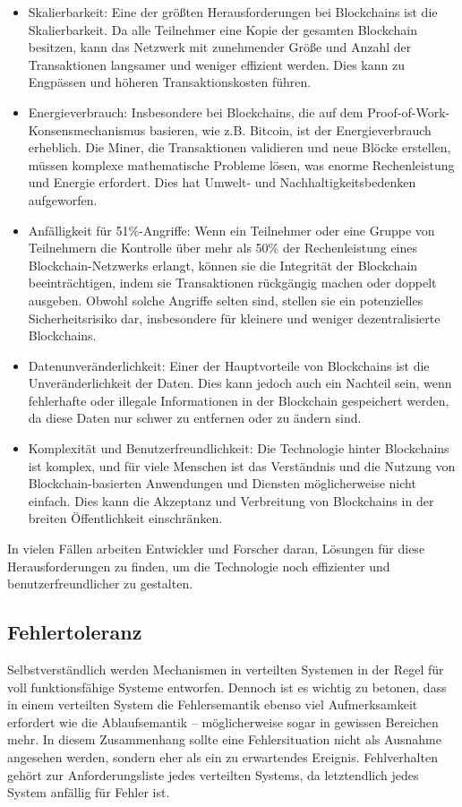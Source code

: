 \begin{itemize}
\item Skalierbarkeit: Eine der größten Herausforderungen bei Blockchains ist die Skalierbarkeit. Da alle Teilnehmer eine Kopie der gesamten Blockchain besitzen, kann das Netzwerk mit zunehmender Größe und Anzahl der Transaktionen langsamer und weniger effizient werden. Dies kann zu Engpässen und höheren Transaktionskosten führen.
\item Energieverbrauch: Insbesondere bei Blockchains, die auf dem Proof-of-Work-Konsensmechanismus basieren, wie z.B. Bitcoin, ist der Energieverbrauch erheblich. Die Miner, die Transaktionen validieren und neue Blöcke erstellen, müssen komplexe mathematische Probleme lösen, was enorme Rechenleistung und Energie erfordert. Dies hat Umwelt- und Nachhaltigkeitsbedenken aufgeworfen.
\item Anfälligkeit für 51\%-Angriffe: Wenn ein Teilnehmer oder eine Gruppe von Teilnehmern die Kontrolle über mehr als 50\% der Rechenleistung eines Blockchain-Netzwerks erlangt, können sie die Integrität der Blockchain beeinträchtigen, indem sie Transaktionen rückgängig machen oder doppelt ausgeben. Obwohl solche Angriffe selten sind, stellen sie ein potenzielles  Sicherheitsrisiko dar, insbesondere für kleinere und weniger dezentralisierte Blockchains.
\item Datenunveränderlichkeit: Einer der Hauptvorteile von Blockchains ist die Unveränderlichkeit der Daten. Dies kann jedoch auch ein Nachteil sein, wenn fehlerhafte oder illegale Informationen in der Blockchain gespeichert werden, da diese Daten nur schwer zu entfernen oder zu ändern sind.
\item Komplexität und Benutzerfreundlichkeit: Die Technologie hinter Blockchains ist komplex, und für viele Menschen ist das Verständnis und die Nutzung von Blockchain-basierten Anwendungen und Diensten möglicherweise nicht einfach. Dies kann die Akzeptanz und Verbreitung von Blockchains in der breiten Öffentlichkeit einschränken.
\end{itemize}
In vielen Fällen arbeiten Entwickler und Forscher daran, Lösungen für diese Herausforderungen zu finden, um die Technologie noch effizienter und benutzerfreundlicher zu gestalten.

\subsection{Fehlertoleranz}

Selbstverständlich werden Mechanismen in verteilten Systemen in der Regel für voll funktionsfähige Systeme entworfen. Dennoch ist es wichtig zu betonen, dass in einem verteilten System die Fehlersemantik ebenso viel Aufmerksamkeit erfordert wie die Ablaufsemantik – möglicherweise sogar in gewissen Bereichen mehr. In diesem Zusammenhang sollte eine Fehlersituation nicht als Ausnahme angesehen werden, sondern eher als ein zu erwartendes Ereignis. Fehlverhalten gehört zur Anforderungsliste jedes verteilten Systems, da letztendlich jedes System anfällig für Fehler ist.

